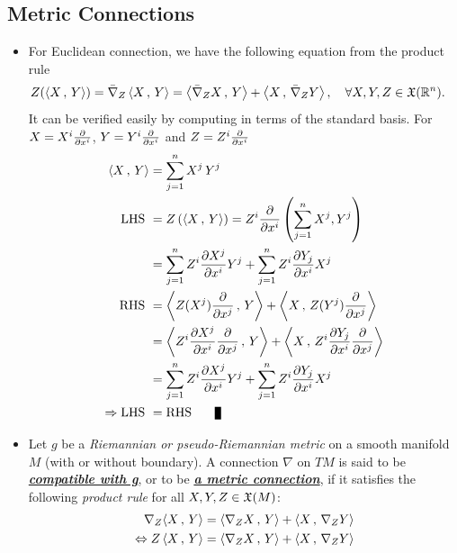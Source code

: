 \documentclass[11pt]{article}
\begin{document}
\subsection{Metric Connections}
\begin{itemize}
\item \begin{remark}
For Euclidean connection, we have the following equation from the product rule
\begin{align*}
Z(\left\langle X\,,\, Y \right\rangle) = \bar{\nabla}_{Z}\left\langle X\,,\, Y \right\rangle &= \left\langle \bar{\nabla}_{Z}X\,,\, Y \right\rangle + \left\langle X\,,\, \bar{\nabla}_{Z}Y \right\rangle, \quad \forall X, Y, Z \in {\mathfrak X}({\mathbb R}^n).
\end{align*} It can be verified easily by computing in terms of the standard basis. For $X = X^i \frac{\partial }{ \partial x^i}$, $Y = Y^i \frac{\partial }{ \partial x^i}$ and $Z = Z^i \frac{\partial }{ \partial x^i}$
\begin{align*}
\inn{X}{Y} &= \sum_{j=1}^{n}X^j\,Y^j \\
\text{LHS }&= Z\paren{\inn{X}{Y}} = Z^i\partdiff{}{x^i}\paren{\sum_{j=1}^{n}X^j,Y^j} \\
&= \sum_{j=1}^{n}Z^i\partdiff{X^j}{x^i}Y^j +  \sum_{j=1}^{n}Z^i\partdiff{Y_j}{x^i}X^{j}\\
\text{RHS }&= \inn{Z(X^j) \partdiff{}{x^j}}{Y} + \inn{X}{Z(Y^j) \partdiff{}{x^j}}\\
&=  \inn{Z^i\partdiff{X^j}{x^i} \partdiff{}{x^j}}{Y} + \inn{X}{Z^i\partdiff{Y_j}{x^i}\partdiff{}{x^j}}\\
&= \sum_{j=1}^{n}Z^i\partdiff{X^j}{x^i}Y^j + \sum_{j=1}^{n}Z^i\partdiff{Y_j}{x^i}X^{j}\\
\Rightarrow \text{LHS }&= \text{RHS } \qed
\end{align*}
\end{remark}

\item \begin{definition}
Let $g$ be a \emph{Riemannian or pseudo-Riemannian metric} on a smooth manifold $M$ (with or without boundary). A connection $\nabla$ on $TM$ is said to be \underline{\emph{\textbf{compatible with g}}}, or to be \underline{\emph{\textbf{a metric connection}}}, if it satisfies the following \emph{product rule} for all
$X, Y, Z \in {\mathfrak X}(M)$:
\begin{align}
 \nabla_{Z}{\left\langle X\,,\, Y \right\rangle} &= \left\langle \nabla_{Z}{X}\,,\, Y \right\rangle + \left\langle X\,,\, \nabla_{Z}{Y} \right\rangle \label{eqn: metric_connection} \\
\Leftrightarrow Z\left\langle X\,,\, Y \right\rangle &= \left\langle \nabla_{Z}{X}\,,\, Y \right\rangle + \left\langle X\,,\, \nabla_{Z}{Y} \right\rangle \nonumber
\end{align} 
\end{definition}




\end{itemize}
\end{document}
